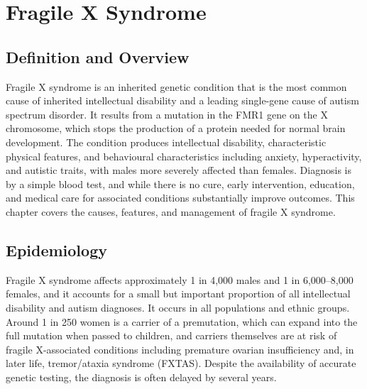 \chapter{Fragile X Syndrome}

\section*{Definition and Overview}
Fragile X syndrome is an inherited genetic condition that is the most common cause of inherited intellectual disability and a leading single-gene cause of autism spectrum disorder. It results from a mutation in the FMR1 gene on the X chromosome, which stops the production of a protein needed for normal brain development. The condition produces intellectual disability, characteristic physical features, and behavioural characteristics including anxiety, hyperactivity, and autistic traits, with males more severely affected than females. Diagnosis is by a simple blood test, and while there is no cure, early intervention, education, and medical care for associated conditions substantially improve outcomes. This chapter covers the causes, features, and management of fragile X syndrome.

\section*{Epidemiology}
Fragile X syndrome affects approximately 1 in 4,000 males and 1 in 6,000--8,000 females, and it accounts for a small but important proportion of all intellectual disability and autism diagnoses. It occurs in all populations and ethnic groups. Around 1 in 250 women is a carrier of a premutation, which can expand into the full mutation when passed to children, and carriers themselves are at risk of fragile X-associated conditions including premature ovarian insufficiency and, in later life, tremor/ataxia syndrome (FXTAS). Despite the availability of accurate genetic testing, the diagnosis is often delayed by several years.

